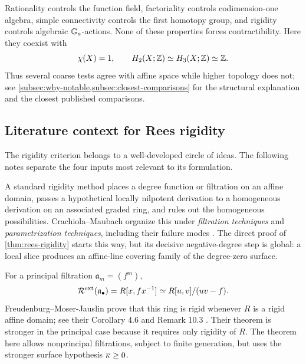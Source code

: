 \begin{observation}\label{obs:package-informative}
Rationality controls the function field, factoriality controls codimension-one algebra, simple connectivity controls the first homotopy group, and rigidity controls algebraic $\mathbb G_a$-actions.  None of these properties forces contractibility.  Here they coexist with
\[
  \chi(X)=1,
  \qquad
  H_2(X;\mathbb Z)\simeq H_3(X;\mathbb Z)\simeq\mathbb Z.
\]
Thus several coarse tests agree with affine space while higher topology does not; see \cref{subsec:why-notable,subsec:closest-comparisons} for the structural explanation and the closest published comparisons.
\end{observation}

\subsection{Literature context for Rees rigidity}\label{subsec:rees-literature}

The rigidity criterion belongs to a well-developed circle of ideas.  The following notes separate the four inputs most relevant to its formulation.

\begin{historicalnote}\label{hist:filtration-method}
A standard rigidity method places a degree function or filtration on an affine domain, passes a hypothetical locally nilpotent derivation to a homogeneous derivation on an associated graded ring, and rules out the homogeneous possibilities.  Crachiola--Maubach organize this under \emph{filtration techniques} and \emph{parametrization techniques}, including their failure modes \cite{CrachiolaMaubach2013}.  The direct proof of \cref{thm:rees-rigidity} starts this way, but its decisive negative-degree step is global: a local slice produces an affine-line covering family of the degree-zero surface.
\end{historicalnote}

\begin{historicalnote}\label{hist:principal-rees}
For a principal filtration $\mathfrak a_m=(f^m)$,
\[
  \mathcal R^{\mathrm{ext}}(\mathfrak a_\bullet)
  =R[x,fx^{-1}]
  \simeq R[u,v]/(uv-f).
\]
Freudenburg--Moser-Jauslin prove that this ring is rigid whenever $R$ is a rigid affine domain; see their Corollary 4.6 and Remark 10.3 \cite{FreudenburgMoserJauslin2013}.  Their theorem is stronger in the principal case because it requires only rigidity of $R$.  The theorem here allows nonprincipal filtrations, subject to finite generation, but uses the stronger surface hypothesis $\overline\kappa\geq0$.
\end{historicalnote}

